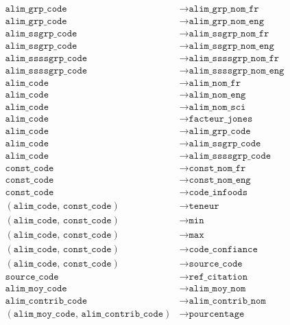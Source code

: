 \documentclass[12pt, a4paper]{article}
\newcommand{\attr}[1]{\texttt{#1}}
\begin{document}
    \begin{align*}
        \attr{alim\_grp\_code}     &\rightarrow \attr{alim\_grp\_nom\_fr} \\
        \attr{alim\_grp\_code}     &\rightarrow \attr{alim\_grp\_nom\_eng} \\
        \attr{alim\_ssgrp\_code}   &\rightarrow \attr{alim\_ssgrp\_nom\_fr} \\
        \attr{alim\_ssgrp\_code}   &\rightarrow \attr{alim\_ssgrp\_nom\_eng} \\
        \attr{alim\_ssssgrp\_code} &\rightarrow \attr{alim\_ssssgrp\_nom\_fr} \\
        \attr{alim\_ssssgrp\_code} &\rightarrow \attr{alim\_ssssgrp\_nom\_eng} \\
        \attr{alim\_code}          &\rightarrow \attr{alim\_nom\_fr} \\
        \attr{alim\_code}          &\rightarrow \attr{alim\_nom\_eng} \\
        \attr{alim\_code}          &\rightarrow \attr{alim\_nom\_sci} \\
        \attr{alim\_code}          &\rightarrow \attr{facteur\_jones} \\
        \attr{alim\_code}          &\rightarrow \attr{alim\_grp\_code} \\
        \attr{alim\_code}          &\rightarrow \attr{alim\_ssgrp\_code} \\
        \attr{alim\_code}          &\rightarrow \attr{alim\_ssssgrp\_code} \\
        \attr{const\_code}         &\rightarrow \attr{const\_nom\_fr} \\
        \attr{const\_code}         &\rightarrow \attr{const\_nom\_eng} \\
        \attr{const\_code}         &\rightarrow \attr{code\_infoods} \\
        (\attr{alim\_code},\,\attr{const\_code}) &\rightarrow \attr{teneur} \\
        (\attr{alim\_code},\,\attr{const\_code}) &\rightarrow \attr{min} \\
        (\attr{alim\_code},\,\attr{const\_code}) &\rightarrow \attr{max} \\
        (\attr{alim\_code},\,\attr{const\_code}) &\rightarrow \attr{code\_confiance} \\
        (\attr{alim\_code},\,\attr{const\_code}) &\rightarrow \attr{source\_code} \\
        \attr{source\_code}        &\rightarrow \attr{ref\_citation} \\
        \attr{alim\_moy\_code}     &\rightarrow \attr{alim\_moy\_nom} \\
        \attr{alim\_contrib\_code} &\rightarrow \attr{alim\_contrib\_nom} \\
        (\attr{alim\_moy\_code},\,\attr{alim\_contrib\_code}) &\rightarrow \attr{pourcentage}
    \end{align*}
\end{document}
